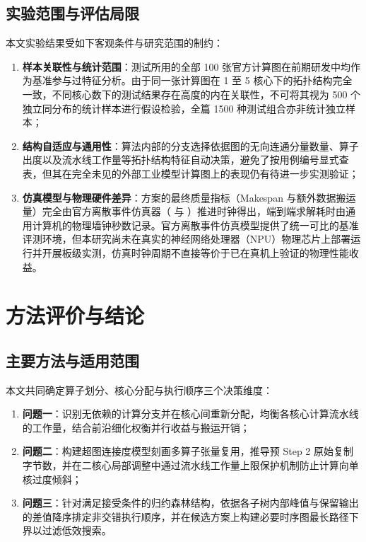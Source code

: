 \documentclass[anonymous,notoc]{gmcm2026}
\providecommand{\tightlist}{\setlength{\itemsep}{0pt}\setlength{\parskip}{0pt}}
\begin{document}
\subsection{实验范围与评估局限}

本文实验结果受如下客观条件与研究范围的制约：

\begin{enumerate}
\def\labelenumi{\arabic{enumi}.}
\tightlist
\item
  \textbf{样本关联性与统计范围}：测试所用的全部 100 张官方计算图在前期研发中均作为基准参与过特征分析。由于同一张计算图在 1 至 5 核心下的拓扑结构完全一致，不同核心数下的测试结果存在高度的内在关联性，不可将其视为 500 个独立同分布的统计样本进行假设检验，全篇 1500 种测试组合亦非统计独立样本；
\item
  \textbf{结构自适应与通用性}：算法内部的分支选择依据图的无向连通分量数量、算子出度以及流水线工作量等拓扑结构特征自动决策，避免了按用例编号显式查表，但其在完全未见的外部工业模型计算图上的表现仍有待进一步实测验证；
\item
  \textbf{仿真模型与物理硬件差异}：方案的最终质量指标（Makespan 与额外数据搬运量）完全由官方离散事件仿真器（\texttt{} 与 \texttt{}）推进时钟得出，端到端求解耗时由通用计算机的物理墙钟秒数记录。官方离散事件仿真模型提供了统一可比的基准评测环境，但本研究尚未在真实的神经网络处理器（NPU）物理芯片上部署运行并开展板级实测，仿真时钟周期不直接等价于已在真机上验证的物理性能收益。
\end{enumerate}


\section{方法评价与结论}

\subsection{主要方法与适用范围}

本文共同确定算子划分、核心分配与执行顺序三个决策维度：

\begin{enumerate}
\def\labelenumi{\arabic{enumi}.}
\tightlist
\item
  \textbf{问题一}：识别无依赖的计算分支并在核心间重新分配，均衡各核心计算流水线的工作量，结合前沿细化权衡并行收益与搬运开销；
\item
  \textbf{问题二}：构建超图连接度模型刻画多算子张量复用，推导预 Step 2 原始复制字节数，并在二核心局部调整中通过流水线工作量上限保护机制防止计算向单核过度倾斜；
\item
  \textbf{问题三}：针对满足接受条件的归约森林结构，依据各子树内部峰值与保留输出的差值降序排定非交错执行顺序，并在候选方案上构建必要时序图最长路径下界以过滤低效搜索。
\end{enumerate}
\end{document}
